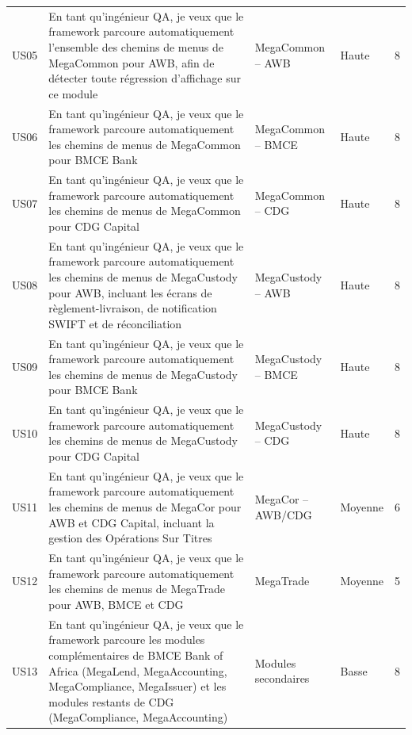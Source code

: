 \documentclass[12pt, a4paper]{report}
\begin{document}
\begin{longtable}{p{0.9cm} p{6.0cm} p{2.6cm} p{1.5cm} p{0.9cm}}
US05 & En tant qu'ingénieur QA, je veux que le framework parcoure automatiquement l'ensemble des chemins de menus de MegaCommon pour AWB, afin de détecter toute régression d'affichage sur ce module
      & MegaCommon – AWB & Haute & 8 \\[4pt]

US06 & En tant qu'ingénieur QA, je veux que le framework parcoure automatiquement les chemins de menus de MegaCommon pour BMCE Bank
      & MegaCommon – BMCE & Haute & 8 \\[4pt]

US07 & En tant qu'ingénieur QA, je veux que le framework parcoure automatiquement les chemins de menus de MegaCommon pour CDG Capital
      & MegaCommon – CDG & Haute & 8 \\[4pt]

US08 & En tant qu'ingénieur QA, je veux que le framework parcoure automatiquement les chemins de menus de MegaCustody pour AWB, incluant les écrans de règlement-livraison, de notification SWIFT et de réconciliation
      & MegaCustody – AWB & Haute & 8 \\[4pt]

US09 & En tant qu'ingénieur QA, je veux que le framework parcoure automatiquement les chemins de menus de MegaCustody pour BMCE Bank
      & MegaCustody – BMCE & Haute & 8 \\[4pt]

US10 & En tant qu'ingénieur QA, je veux que le framework parcoure automatiquement les chemins de menus de MegaCustody pour CDG Capital
      & MegaCustody – CDG & Haute & 8 \\[4pt]

US11 & En tant qu'ingénieur QA, je veux que le framework parcoure automatiquement les chemins de menus de MegaCor pour AWB et CDG Capital, incluant la gestion des Opérations Sur Titres
      & MegaCor – AWB/CDG & Moyenne & 6 \\[4pt]

US12 & En tant qu'ingénieur QA, je veux que le framework parcoure automatiquement les chemins de menus de MegaTrade pour AWB, BMCE et CDG
      & MegaTrade & Moyenne & 5 \\[4pt]

US13 & En tant qu'ingénieur QA, je veux que le framework parcoure les modules complémentaires de BMCE Bank of Africa (MegaLend, MegaAccounting, MegaCompliance, MegaIssuer) et les modules restants de CDG (MegaCompliance, MegaAccounting)
      & Modules secondaires & Basse & 8 \\[4pt]


\end{longtable}
\end{document}

